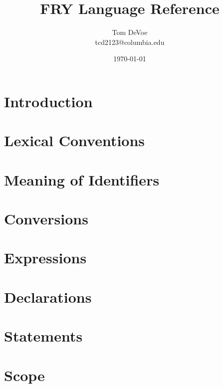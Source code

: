 \documentclass{article}
\title{FRY Language Reference}
\author{Tom DeVoe \\ tcd2123@columbia.edu}
\date{\today}
\begin{document}
\maketitle

\section{Introduction}

\section{Lexical Conventions}

\section{Meaning of Identifiers}

\section{Conversions}

\section{Expressions}

\section{Declarations}


\section{Statements}

\section{Scope}
\end{document}
